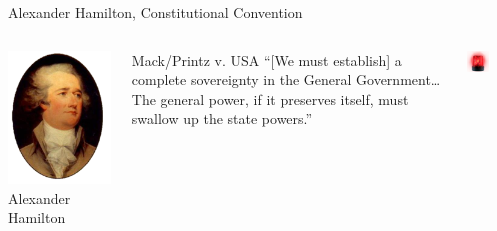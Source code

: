 \begin{frame}{Alexander Hamilton, Constitutional Convention}
    \begin{columns}[onlytextwidth]
            \centering
            \includegraphics[height=0.75\textheight]{img/hamilton.png} \\
            Alexander Hamilton \\

            \begin{block}{Mack/Printz v. USA}
                ``[We must establish] a complete sovereignty in the General Government\ldots The general power, if it preserves itself, must swallow up the state powers.''
            \end{block}
            \pause
            {
                \centering
                \includegraphics[width=0.5\textwidth]{img/red-light.png} \\
            }
    \end{columns}
\end{frame}

